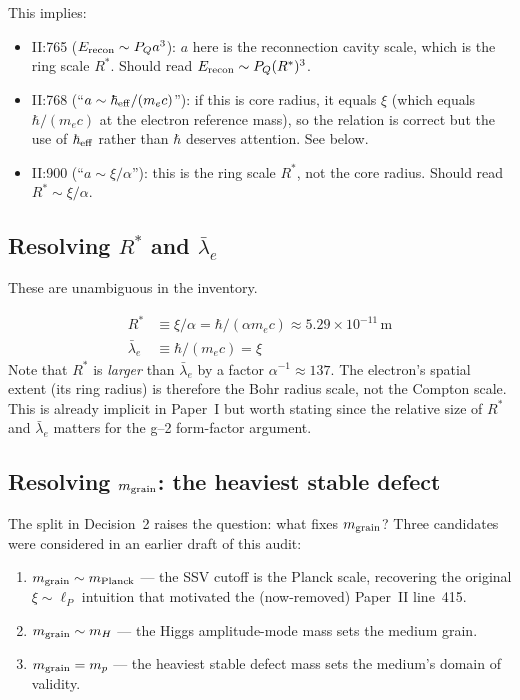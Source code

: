 \documentclass[11pt,a4paper]{article}
\begin{document}
This implies:
\begin{itemize}
\item II:765 ($E_{\rm recon} \sim P_Q a^3$): $a$ here is the reconnection
      cavity scale, which is the ring scale $R^*$.  Should read
      $E_{\rm recon} \sim P_Q (R^*)^3$.
\item II:768 (``$a \sim \hbar_{\rm eff}/(m_e c)$''): if this is core radius,
      it equals $\xi$ (which equals $\hbar/(m_e c)$ at the electron
      reference mass), so the relation is correct but the use of
      $\hbar_{\rm eff}$ rather than $\hbar$ deserves attention.  See
      below.
\item II:900 (``$a \sim \xi/\alpha$''): this is the ring scale $R^*$,
      not the core radius.  Should read $R^* \sim \xi/\alpha$.
\end{itemize}

\subsection{Resolving $R^*$ and $\bar\lambda_e$}

These are unambiguous in the inventory.

\begin{decisionbox}
\begin{align}
    R^*       &\equiv \xi/\alpha = \hbar/(\alpha m_e c)
                \approx 5.29\times 10^{-11}\,\mathrm{m}
                \tag{electron equilibrium ring radius, $\sim$ Bohr radius}\\
    \bar\lambda_e &\equiv \hbar/(m_e c) = \xi
                \tag{reduced electron Compton wavelength}
\end{align}
Note that $R^*$ is \emph{larger} than $\bar\lambda_e$ by a factor
$\alpha^{-1} \approx 137$.  The electron's spatial extent (its ring radius)
is therefore the Bohr radius scale, not the Compton scale.  This is
already implicit in Paper~I but worth stating since the relative size of
$R^*$ and $\bar\lambda_e$ matters for the g--2 form-factor argument.
\end{decisionbox}

\subsection{Resolving $m_{\rm grain}$: the heaviest stable defect}

The split in Decision~2 raises the question: what fixes
$m_{\rm grain}$?  Three candidates were considered in an earlier draft
of this audit:
\begin{enumerate}
\item $m_{\rm grain} \sim m_{\rm Planck}$ --- the SSV cutoff is the
      Planck scale, recovering the original $\xi \sim \ell_P$
      intuition that motivated the (now-removed) Paper~II line~415.
\item $m_{\rm grain} \sim m_H$ --- the Higgs amplitude-mode mass sets
      the medium grain.
\item $m_{\rm grain} = m_p$ --- the heaviest stable defect mass sets
      the medium's domain of validity.
\end{enumerate}
\end{document}
